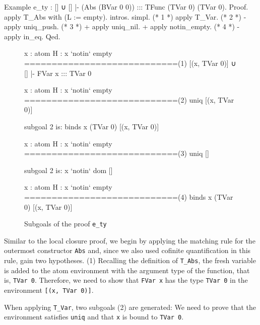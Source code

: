 \documentclass[a4paper, 11pt, fleqn]{scrreprt}
\newcommand{\coqinline}[1]{\texttt{#1}}
\begin{document}
	\begin{coqcode}
Example e_ty :  [] ∪ [] |- (Abs (BVar 0 0)) ::: TFunc (TVar 0) (TVar 0).
  Proof.
    apply T_Abs with (L := empty).
    intros. simpl. (* 1 *)
    apply T_Var. (* 2 *)
    - apply uniq_push. (* 3 *)
      + apply uniq_nil.
      + apply notin_empty. (* 4 *)
    - apply in_eq.
  Qed.
	\end{coqcode}
	\begin{figure}[H]
	\begin{flushleft}
		\begin{minipage}[t]{.47 \linewidth}
			\begin{coqcode}
x : atom
H : x `notin` empty
============================(1)
[(x, TVar 0)] ∪ [] |- FVar x ::: TVar 0

				
x : atom
H : x `notin` empty
============================(2)
uniq [(x, TVar 0)]

subgoal 2 is:
binds x (TVar 0) [(x, TVar 0)]
			\end{coqcode}
		\end{minipage}
		\hfill
		\vrule
		\vspace{.5 em}
		\begin{minipage}[t]{.48 \linewidth}
			\begin{coqcode}
  x : atom
  H : x `notin` empty
  ============================(3)
  uniq []

  subgoal 2 is:
  x `notin` dom []


  x : atom
  H : x `notin` empty
  ============================(4)
  binds x (TVar 0) [(x, TVar 0)]
			\end{coqcode}
		\end{minipage}
	\end{flushleft}
	\caption{Subgoals of the proof \coqinline{e_ty}}
	\label{lcproof}
\end{figure}
	\noindent
Similar to the local closure proof, we begin by applying the matching rule for the outermost constructor \coqinline{Abs} and, since we also used cofinite quantification in this rule, gain two hypotheses. (1) Recalling the definition of \coqinline{T_Abs}, the fresh variable is added to the atom environment with the argument type of the function, that is, \coqinline{TVar 0}. Therefore, we need to show that \coqinline{FVar x} has the type \coqinline{TVar 0} in the environment \coqinline{[(x, TVar 0)]}.
\par
When applying \coqinline{T_Var}, two subgoals (2) are generated: We need to prove that the environment satisfies \coqinline{uniq} and that \coqinline{x} is bound to \coqinline{TVar 0}.
\end{document}
